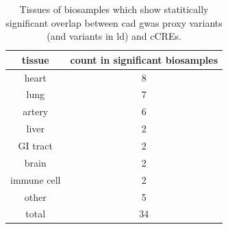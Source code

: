 \begin{table}[h!]
\capstart
\centering
\begin{minipage}{\captionwidth}
    \caption[enriched tissues]{ \newline Tissues of biosamples which show statitically significant overlap between \ac{cad} \ac{gwas} proxy variants (and variants in \ac{ld}) and \acp{cCRE}.}
    \label{tab:enriched_tissues}
\end{minipage}
\begin{tabular}{|c|c|}
    \hline
    tissue      & count in significant biosamples \\ \hline
    heart       & 8                               \\
    lung        & 7                               \\
    artery      & 6                               \\
    liver       & 2                               \\
    GI tract    & 2                               \\
    brain       & 2                               \\
    immune cell & 2                               \\
    other       & 5                               \\ \hline
    total       & 34                              \\ \hline
    \end{tabular}
\end{table}
